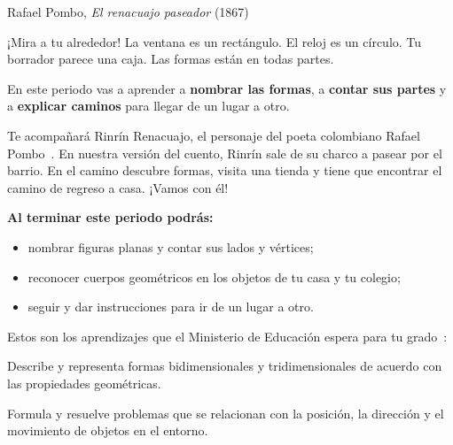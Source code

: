 \documentclass[11pt]{article}
\begin{document}
\encabezado

{Rafael Pombo, \emph{El renacuajo paseador} (1867)}


¡Mira a tu alrededor! La ventana es un rectángulo. El reloj es un
círculo. Tu borrador parece una caja. Las formas están en todas partes.

En este periodo vas a aprender a \textbf{nombrar las formas}, a
\textbf{contar sus partes} y a \textbf{explicar caminos} para llegar de un
lugar a otro.

Te acompañará Rinrín Renacuajo, el personaje del poeta colombiano Rafael
Pombo~\cite{pombo}. En nuestra versión del cuento, Rinrín sale de su charco a pasear
por el barrio. En el camino descubre formas, visita una tienda y tiene
que encontrar el camino de regreso a casa. ¡Vamos con él!

\textbf{Al terminar este periodo podrás:}
\begin{itemize}
  \item nombrar figuras planas y contar sus lados y vértices;
  \item reconocer cuerpos geométricos en los objetos de tu casa y tu colegio;
  \item seguir y dar instrucciones para ir de un lugar a otro.
\end{itemize}

Estos son los aprendizajes que el Ministerio de Educación espera para tu
grado~\cite{mendba}:

\begin{dba}
Describe y representa formas bidimensionales y tridimensionales de
acuerdo con las propiedades geométricas.
\end{dba}

\begin{dba}
Formula y resuelve problemas que se relacionan con la posición, la
dirección y el movimiento de objetos en el entorno.
\end{dba}
\end{document}
